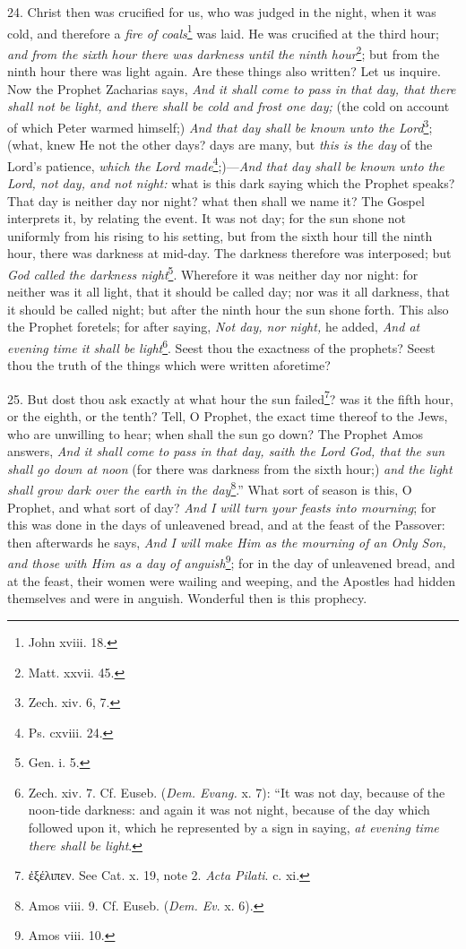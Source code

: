 24. Christ then was crucified for us, who was judged in the night, when it was cold, and therefore a \emph{fire of coals}\footnote{John xviii. 18.} was laid. He was crucified at the third hour; \emph{and from the sixth} \emph{hour there was darkness until the ninth hour}\footnote{Matt. xxvii. 45.}; but from the ninth hour there was light again. Are these things also written? Let us inquire. Now the Prophet Zacharias says, \emph{And it shall come to pass in that day, that there shall not be light, and there shall be cold and frost one day;} (the cold on account of which Peter warmed himself;) \emph{And that day shall be known unto the Lord}\footnote{Zech. xiv. 6, 7.}; (what, knew He not the other days? days are many, but \emph{this is the day} of the Lord’s patience, \emph{which the Lord made}\footnote{Ps. cxviii. 24.};)—\emph{And that day shall be known unto the Lord, not day, and not night: } what is this dark saying which the Prophet speaks? That day is neither day nor night? what then shall we name it? The Gospel interprets it, by relating the event. It was not day; for the sun shone not uniformly from his rising to his setting, but from the sixth hour till the ninth hour, there was darkness at mid-day. The darkness therefore was interposed; but \emph{God called the darkness night}\footnote{Gen. i. 5.}. Wherefore it was neither day nor night: for neither was it all light, that it should be called day; nor was it all darkness, that it should be called night; but after the ninth hour the sun shone forth. This also the Prophet foretels; for after saying, \emph{Not day, nor night,} he added, \emph{And at evening time it shall be light}\footnote{Zech. xiv. 7. Cf. Euseb. (\emph{Dem. Evang.} x. 7): “It was not day, because of the noon-tide darkness: and again it was not night, because of the day which followed upon it, which he represented by a sign in saying, \emph{at evening time there shall be light}.}. Seest thou the exactness of the prophets? Seest thou the truth of the things which were written aforetime?

25. But dost thou ask exactly at what hour the sun failed\footnote{\textgreek{ἐξέλιπεν}. See Cat. x. 19, note 2. \emph{Acta Pilati}. c. xi.}? was it the fifth hour, or the eighth, or the tenth? Tell, O Prophet, the exact time thereof to the Jews, who are unwilling to hear; when shall the sun go down? The Prophet Amos answers, \emph{And it shall come to pass in that day, saith the Lord God, that the sun shall go down at noon} (for there was darkness from the sixth hour;) \emph{and the light shall grow dark over the earth in the day}\footnote{Amos viii. 9. Cf. Euseb. (\emph{Dem. Ev}. x. 6).}.” What sort of season is this, O Prophet, and what sort of day? \emph{And I will turn your feasts into mourning}; for this was done in the days of unleavened bread, and at the feast of the Passover: then afterwards he says, \emph{And I will make Him as the mourning of an Only Son, and those with Him as a day of anguish}\footnote{Amos viii. 10.}; for in the day of unleavened bread, and at the feast, their women were wailing and weeping, and the Apostles had hidden themselves and were in anguish. Wonderful then is this prophecy.

